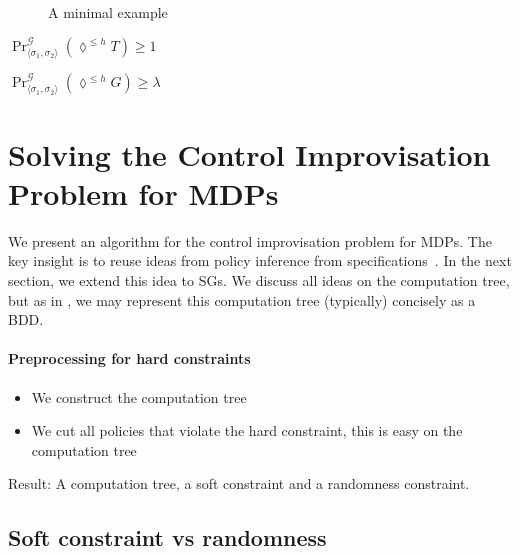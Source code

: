 \documentclass[conference]{IEEEtran}
\theoremstyle{remark}
\newcommand{\sg}{\mathcal{G}}
\newcommand{\eventually}[1]{\lozenge^{\leq #1}}
\newcommand{\sched}{\sigma}
\begin{document}
\begin{figure}
\caption{A minimal example}
\end{figure}



\begin{mdframed}

\begin{compactenum}
	\item $\Pr^\sg_{\langle \sched_1,\sched_2 \rangle}(\eventually{h} T) \geq 1$
	\item $\Pr^\sg_{\langle \sched_1,\sched_2 \rangle}(\eventually{h} G) \geq \lambda$ 
\end{compactenum}
\end{mdframed}




\section{Solving the Control Improvisation Problem for MDPs}
We present an algorithm for the control improvisation problem for MDPs. The key insight is to reuse ideas from policy inference from specifications~\cite{DBLP:conf/cav/Vazquez-Chanlatte20}.
In the next section, we extend this idea to SGs. We discuss all ideas on the computation tree, but as in \cite{DBLP:conf/cav/Vazquez-Chanlatte20}, we may represent this computation tree (typically) concisely as a BDD.

\paragraph{Preprocessing for hard constraints}
\begin{itemize}
\item We construct the computation tree	
\item We cut all policies that violate the hard constraint, this is easy on the computation tree
\end{itemize}
Result: A computation tree, a soft constraint and a randomness constraint.



\subsection{Soft constraint vs randomness}
\end{document}
